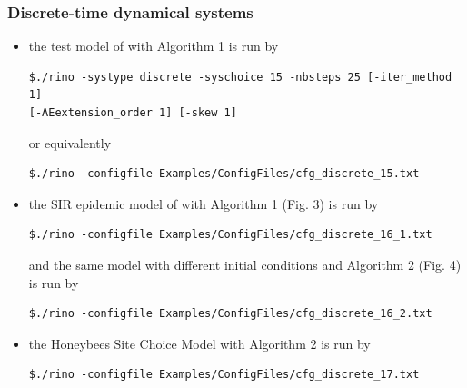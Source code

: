 \documentclass{article}
\begin{document}
\subsubsection{Discrete-time dynamical systems}
\begin{itemize}[noitemsep]
\item the test model of \cite{adhs21} with Algorithm 1 is run by 
\begin{verbatim}
$./rino -systype discrete -syschoice 15 -nbsteps 25 [-iter_method 1] 
[-AEextension_order 1] [-skew 1]
\end{verbatim} 
or equivalently
\begin{verbatim}
$./rino -configfile Examples/ConfigFiles/cfg_discrete_15.txt
\end{verbatim}
\item the SIR epidemic model of \cite{adhs21} with Algorithm 1 (Fig. 3) is run by 
\begin{verbatim}
$./rino -configfile Examples/ConfigFiles/cfg_discrete_16_1.txt
\end{verbatim} 
and the same model with different initial conditions and Algorithm 2 (Fig. 4) is run by  
\begin{verbatim}
$./rino -configfile Examples/ConfigFiles/cfg_discrete_16_2.txt
\end{verbatim}
\item the Honeybees Site Choice Model \cite{adhs21} with Algorithm 2 is run by 
\begin{verbatim}
$./rino -configfile Examples/ConfigFiles/cfg_discrete_17.txt
\end{verbatim}
 \end{itemize}
 
\end{document}

